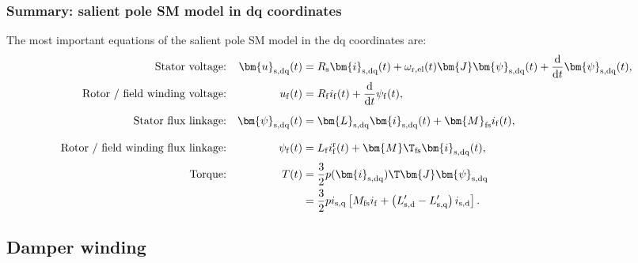\begin{frame}
	\frametitle{Summary: salient pole SM model in dq coordinates}
    The most important equations of the salient pole SM model in the  dq coordinates are:
	\begin{equation*}
		\begin{alignedat}{4}
			&&\mbox{Stator voltage:}&& \quad\bm{u}_\mathrm{s,dq}(&t) &&= R_\mathrm{s} \bm{i}_\mathrm{s,dq}(t)+ \omega_\mathrm{r,el}(t)\bm{J}\bm{\psi}_\mathrm{s,dq}(t) + \frac{\mathrm{d}}{\mathrm{d}t}\bm{\psi}_\mathrm{s,dq}(t),\\
			&&\mbox{Rotor / field winding  voltage:}&& \quad u_\mathrm{f}(&t) &&= R_\mathrm{f}i_\mathrm{f}(t)+\frac{\mathrm{d}}{\mathrm{d}t}\psi_\mathrm{f}(t),\\
			&&\mbox{Stator flux linkage:}&& \quad \bm{\psi}_\mathrm{s,dq}(&t) &&= \bm{L}_\mathrm{s,dq}\bm{i}_{\mathrm{s,dq}}(t) + \bm{M}_\mathrm{fs} i_{\mathrm{f}}(t), \vphantom{\frac{\mathrm{d}}{\mathrm{d}t}}\\
			&&\mbox{Rotor / field winding flux linkage:}&& \psi_\mathrm{f}(&t) &&= L_\mathrm{f} i^\mathrm{r}_\mathrm{f}(t) + \bm{M}\T_\mathrm{fs} \bm{i}_\mathrm{s,dq}(t),\vphantom{\frac{\mathrm{d}}{\mathrm{d}t}}\\
			&&\mbox{Torque:}&& \quad T(&t) &&= \frac{3}{2} p (\bm{i}_\mathrm{s,dq})\T\bm{J}\bm{\psi}_\mathrm{s,dq}\\
			&&&&&&&=\frac{3}{2} p i_\mathrm{s,q}\left[ M_\mathrm{fs} i_{\mathrm{f}} + \left(L'_\mathrm{s,d}-L'_\mathrm{s,q}\right)i_\mathrm{s,d}\right].
		\end{alignedat}
	\end{equation*}      
\end{frame}

\subsection{Damper winding}

